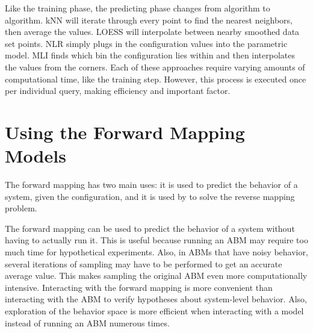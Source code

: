 Like the training phase, the predicting phase changes from algorithm to algorithm.
kNN will iterate through every point to find the nearest neighbors, then average the values.
LOESS will interpolate between nearby smoothed data set points.
NLR simply plugs in the configuration values into the parametric model.
MLI finds which bin the configuration lies within and then interpolates the values from the corners.
Each of these approaches require varying amounts of computational time, like the training step.
However, this process is executed once per individual query, making efficiency and important factor.


\section{Using the Forward Mapping Models}

The forward mapping has two main uses: it is used to predict the behavior of a system, given the configuration, and it is used by \fw to solve the reverse mapping problem.

The forward mapping can be used to predict the behavior of a system without having to actually run it.
This is useful because running an ABM may require too much time for hypothetical experiments.
Also, in ABMs that have noisy behavior, several iterations of sampling may have to be performed to get an accurate average value.
This makes sampling the original ABM even more computationally intensive.
Interacting with the forward mapping is more convenient than interacting with the ABM to verify hypotheses about system-level behavior.
Also, exploration of the behavior space is more efficient when interacting with a model instead of running an ABM numerous times.

